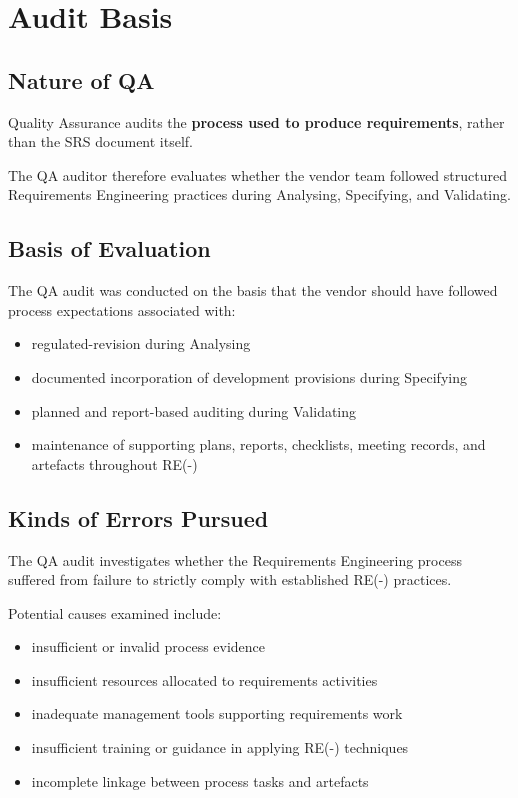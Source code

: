 \documentclass[11pt,a4paper]{article}
\begin{document}

\section{Audit Basis}

\subsection{Nature of QA}

Quality Assurance audits the \textbf{process used to produce requirements}, rather than the SRS document itself.

The QA auditor therefore evaluates whether the vendor team followed structured Requirements Engineering practices during Analysing, Specifying, and Validating.

\subsection{Basis of Evaluation}

The QA audit was conducted on the basis that the vendor should have followed process expectations associated with:

\begin{itemize}[leftmargin=*]
\item regulated-revision during Analysing
\item documented incorporation of development provisions during Specifying
\item planned and report-based auditing during Validating
\item maintenance of supporting plans, reports, checklists, meeting records, and artefacts throughout RE(-)
\end{itemize}

\subsection{Kinds of Errors Pursued}

The QA audit investigates whether the Requirements Engineering process suffered from failure to strictly comply with established RE(-) practices.

Potential causes examined include:

\begin{itemize}[leftmargin=*]
\item insufficient or invalid process evidence
\item insufficient resources allocated to requirements activities
\item inadequate management tools supporting requirements work
\item insufficient training or guidance in applying RE(-) techniques
\item incomplete linkage between process tasks and artefacts
\end{itemize}
\end{document}
